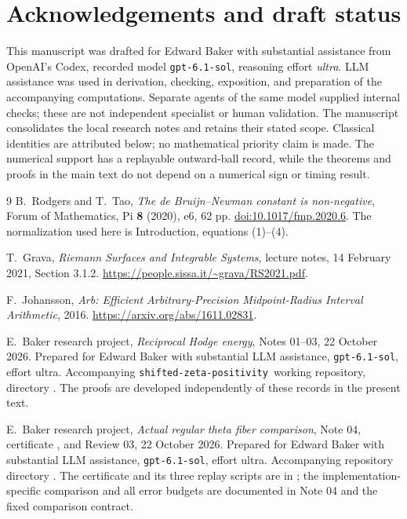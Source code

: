 \documentclass[11pt,letterpaper]{article}
\numberwithin{equation}{section}
\theoremstyle{definition}
\theoremstyle{remark}
\newcommand{\repo}{\texttt{shifted-zeta-positivity}}
\begin{document}
\section*{Acknowledgements and draft status}
This manuscript was drafted for Edward Baker with substantial assistance
from OpenAI's Codex, recorded model \texttt{gpt-6.1-sol}, reasoning effort
\emph{ultra}. LLM assistance was used in derivation, checking, exposition,
and preparation of the accompanying computations. Separate agents of the
same model supplied internal checks; these are not independent specialist
or human validation. The manuscript consolidates the local research notes
and retains their stated scope. Classical identities are attributed below;
no mathematical priority claim is made. The numerical support has a
replayable outward-ball record, while the theorems and proofs in the main
text do not depend on a numerical sign or timing result.
\begin{thebibliography}{9}
B.~Rodgers and T.~Tao,
\emph{The de Bruijn--Newman constant is non-negative},
Forum of Mathematics, Pi \textbf{8} (2020), e6, 62 pp.
\href{https://doi.org/10.1017/fmp.2020.6}{doi:10.1017/fmp.2020.6}.
The normalization used here is Introduction, equations (1)--(4).

T.~Grava, \emph{Riemann Surfaces and Integrable Systems},
lecture notes, 14 February 2021, Section 3.1.2.
\url{https://people.sissa.it/~grava/RS2021.pdf}.

F.~Johansson, \emph{Arb: Efficient Arbitrary-Precision Midpoint-Radius
Interval Arithmetic}, 2016.
\url{https://arxiv.org/abs/1611.02831}.

E.~Baker research project, \emph{Reciprocal Hodge energy},
Notes 01--03, 22 October 2026. Prepared for Edward Baker with substantial
LLM assistance, \texttt{gpt-6.1-sol}, effort ultra.
Accompanying \repo\ working repository, directory
.
The proofs are developed independently of these records in the present text.

E.~Baker research project, \emph{Actual regular theta fiber comparison},
Note 04, certificate ,
and Review 03, 22 October 2026. Prepared for Edward Baker with substantial
LLM assistance, \texttt{gpt-6.1-sol}, effort ultra.
Accompanying repository directory
.
The certificate and its three replay scripts are in ;
the implementation-specific comparison and all error budgets are documented
in Note 04 and the fixed comparison contract.
\end{thebibliography}
\end{document}

